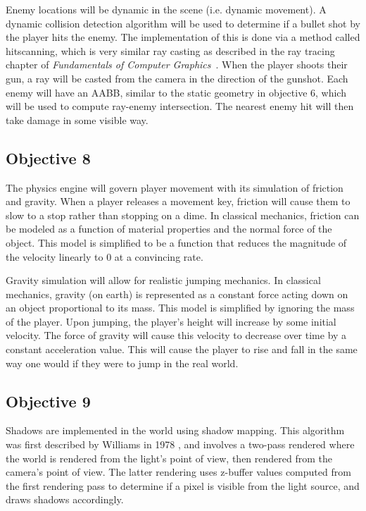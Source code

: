 \documentclass {article}
\begin{document}
Enemy locations will be dynamic in the scene (i.e. dynamic movement). A dynamic collision detection algorithm will be used to determine if a bullet shot by the player hits the enemy.
The implementation of this is done via a method called hitscanning, which is very similar ray casting as described in the ray tracing chapter of \textit{Fundamentals of Computer Graphics}~\cite{rtbook}. When the player shoots their gun, a ray will be casted from the camera in the direction of the gunshot. Each enemy will have an AABB, similar to the static geometry in objective 6, which will be used to compute ray-enemy intersection. The nearest enemy hit will then take damage in some visible way.


\subsection{Objective 8}
The physics engine will govern player movement with its simulation of friction and gravity. When a player releases a movement key, friction will cause them to slow to a stop rather than stopping on a dime. In classical mechanics, friction can be modeled as a function of material properties and the normal force of the object. This model is simplified to be a function that reduces the magnitude of the velocity linearly to 0 at a convincing rate.

Gravity simulation will allow for realistic jumping mechanics. In classical mechanics, gravity (on earth) is represented as a constant force acting down on an object proportional to its mass. This model is simplified by ignoring the mass of the player. Upon jumping, the player's height will increase by some initial velocity. The force of gravity will cause this velocity to decrease over time by a constant acceleration value. This will cause the player to rise and fall in the same way one would if they were to jump in the real world.

\subsection{Objective 9}
Shadows are implemented in the world using shadow mapping. This algorithm was first described by Williams in 1978 \cite{shadowmapping}, and involves a two-pass rendered where the world is rendered from the light's point of view, then rendered from the camera's point of view. The latter rendering uses z-buffer values computed from the first rendering pass to determine if a pixel is visible from the light source, and draws shadows accordingly.
\end{document}
